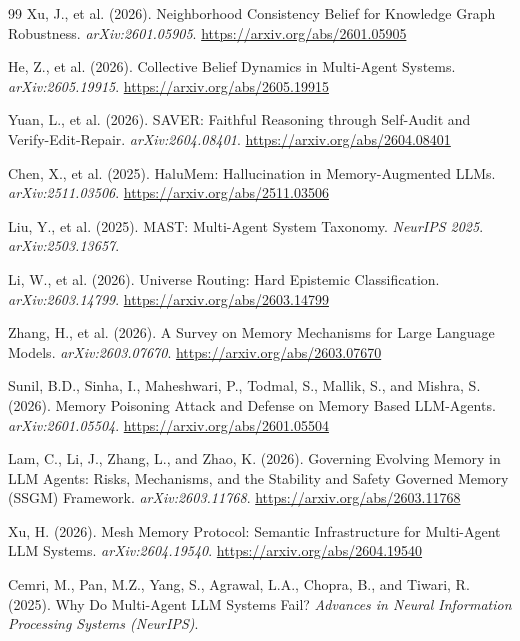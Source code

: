 \documentclass[11pt,letterpaper]{article}
\begin{document}
\begin{thebibliography}{99}
Xu, J., et al. (2026).
\newblock Neighborhood Consistency Belief for Knowledge Graph Robustness.
\newblock \textit{arXiv:2601.05905}. \url{https://arxiv.org/abs/2601.05905}

He, Z., et al. (2026).
\newblock Collective Belief Dynamics in Multi-Agent Systems.
\newblock \textit{arXiv:2605.19915}. \url{https://arxiv.org/abs/2605.19915}

Yuan, L., et al. (2026).
\newblock SAVER: Faithful Reasoning through Self-Audit and Verify-Edit-Repair.
\newblock \textit{arXiv:2604.08401}. \url{https://arxiv.org/abs/2604.08401}

Chen, X., et al. (2025).
\newblock HaluMem: Hallucination in Memory-Augmented LLMs.
\newblock \textit{arXiv:2511.03506}. \url{https://arxiv.org/abs/2511.03506}

Liu, Y., et al. (2025).
\newblock MAST: Multi-Agent System Taxonomy.
\newblock \textit{NeurIPS 2025}. \textit{arXiv:2503.13657}.

Li, W., et al. (2026).
\newblock Universe Routing: Hard Epistemic Classification.
\newblock \textit{arXiv:2603.14799}. \url{https://arxiv.org/abs/2603.14799}

Zhang, H., et al. (2026).
\newblock A Survey on Memory Mechanisms for Large Language Models.
\newblock \textit{arXiv:2603.07670}. \url{https://arxiv.org/abs/2603.07670}

Sunil, B.D., Sinha, I., Maheshwari, P., Todmal, S., Mallik, S., and Mishra, S. (2026).
\newblock Memory Poisoning Attack and Defense on Memory Based LLM-Agents.
\newblock \textit{arXiv:2601.05504}. \url{https://arxiv.org/abs/2601.05504}

Lam, C., Li, J., Zhang, L., and Zhao, K. (2026).
\newblock Governing Evolving Memory in LLM Agents: Risks, Mechanisms, and the Stability and Safety Governed Memory (SSGM) Framework.
\newblock \textit{arXiv:2603.11768}. \url{https://arxiv.org/abs/2603.11768}

Xu, H. (2026).
\newblock Mesh Memory Protocol: Semantic Infrastructure for Multi-Agent LLM Systems.
\newblock \textit{arXiv:2604.19540}. \url{https://arxiv.org/abs/2604.19540}

Cemri, M., Pan, M.Z., Yang, S., Agrawal, L.A., Chopra, B., and Tiwari, R. (2025).
\newblock Why Do Multi-Agent LLM Systems Fail?
\newblock \textit{Advances in Neural Information Processing Systems (NeurIPS)}.

\end{thebibliography}
\end{document}
